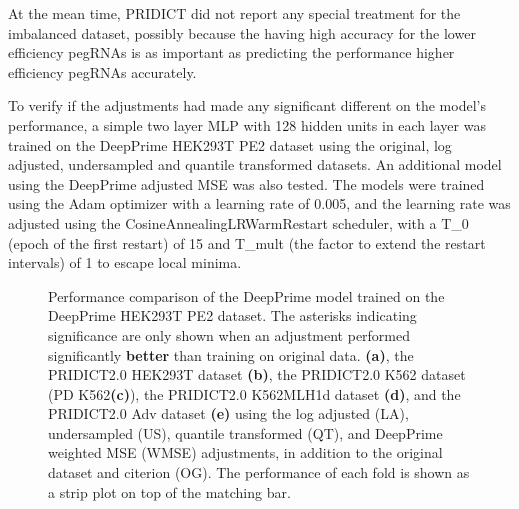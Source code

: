 At the mean time, PRIDICT did not report any special treatment for the imbalanced dataset, possibly because the having high accuracy for the lower efficiency pegRNAs is as important as predicting the performance higher efficiency pegRNAs accurately. 

To verify if the adjustments had made any significant different on the model's performance, a simple two layer MLP with 128 hidden units in each layer was trained on the DeepPrime HEK293T PE2 dataset using the original, log adjusted, undersampled and quantile transformed datasets. An additional model using the DeepPrime adjusted MSE was also tested. The models were trained using the Adam optimizer with a learning rate of 0.005, and the learning rate was adjusted using the CosineAnnealingLRWarmRestart scheduler, with a T\_0 (epoch of the first restart) of 15 and T\_mult (the factor to extend the restart intervals) of 1 to escape local minima. 

\begin{figure}
    \centering
    \vspace{-3mm} %
    \vspace{-3mm}
    \vspace{-3mm}
    \vspace{-3mm}
    \vspace{-3mm}
    \caption[DeepPrime model performance comparison after adjustments]{Performance comparison of the DeepPrime model trained on the DeepPrime HEK293T PE2 dataset. The asterisks indicating significance are only shown when an adjustment performed significantly \textbf{better} than training on original data. \textbf{(a)}, the PRIDICT2.0 HEK293T dataset \textbf{(b)}, the PRIDICT2.0 K562 dataset (PD K562\textbf{(c)}), the PRIDICT2.0 K562MLH1d dataset \textbf{(d)}, and the PRIDICT2.0 Adv dataset \textbf{(e)} using the log adjusted (LA), undersampled (US), quantile transformed (QT), and DeepPrime weighted MSE (WMSE) adjustments, in addition to the original dataset and citerion (OG). 
    The performance of each fold is shown as a strip plot on top of the matching bar.}
    \label{fig:adjustment-performance}
\end{figure}


